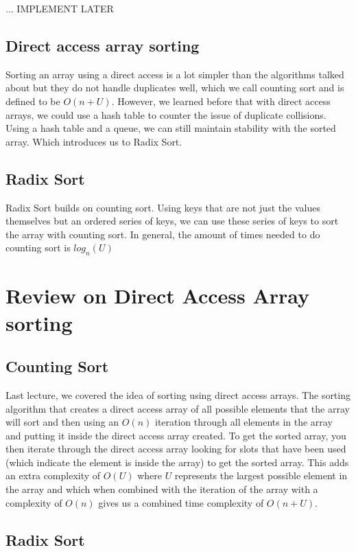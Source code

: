 \documentclass[11pt,a4paper,english]{report}
\begin{document}
... IMPLEMENT LATER

\subsection{Direct access array sorting}

Sorting an array using a direct access is a lot simpler than the algorithms talked about but they do not handle duplicates well, which we call counting sort and is defined to be $O(n + U)$. However, we learned before that with direct access arrays, we could use a hash table to counter the issue of duplicate collisions. Using a hash table and a queue, we can still maintain stability with the sorted array. Which introduces us to Radix Sort.

\subsection{Radix Sort}

Radix Sort builds on counting sort. Using keys that are not just the values themselves but an ordered series of keys, we can use these series of keys to sort the array with counting sort. In general, the amount of times needed to do counting sort is $log_{n}{(U)}$


\section{Review on Direct Access Array sorting}

\subsection{Counting Sort}
Last lecture, we covered the idea of sorting using direct access arrays. The sorting algorithm that creates a direct access array of all possible elements that the array will sort and then using an $O(n)$ iteration through all elements in the array and putting it inside the direct access array created. To get the sorted array, you then iterate through the direct access array looking for slots that have been used (which indicate the element is inside the array) to get the sorted array. This adds an extra complexity of $O(U)$ where $U$ represents the largest possible element in the array and which when combined with the iteration of the array with a complexity of $O(n)$ gives us a combined time complexity of $O(n + U)$.

\subsection{Radix Sort}
\end{document}
